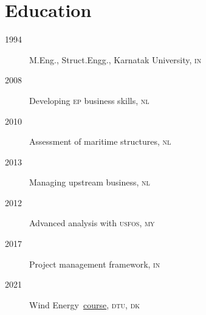 \section*{Education} %
\label{sec:edu}

\begin{description}
  \item[1994]M.Eng., Struct.Engg., Karnatak University, \textsc{in}
  \item[2008]Developing \textsc{ep} business skills, \textsc{nl}
  \item[2010]Assessment of maritime structures, \textsc{nl}
  \item[2013]Managing upstream business, \textsc{nl}
  \item[2012]Advanced analysis with \textsc{usfos}, \textsc{my}
  \item[2017]Project management framework, \textsc{in}
  \item[2021]Wind Energy~\href{https://www.coursera.org/account/accomplishments/certificate/Y9CRZSXUSTWB}{course}, \textsc{dtu}, \textsc{dk}
\end{description}


